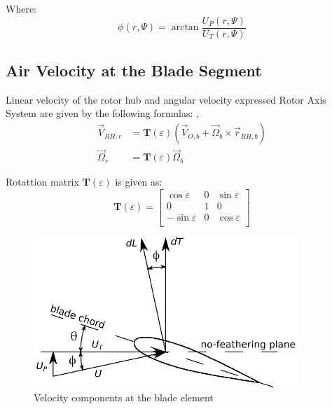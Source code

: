Where:
\begin{equation}
  \phi \left( r , \Psi \right)
  =
  \arctan \frac{ U_P \left( r, \Psi \right) }{ U_T \left( r, \Psi \right) }
\end{equation}

\subsection{Air Velocity at the Blade Segment}

Linear velocity of the rotor hub and angular velocity expressed Rotor Axis System are given by the following formulas: \cite{Stepniewski1984}, \cite{Bramwell2001}
\begin{align}
  {\vec V}_{RH,r}
  &=
  {\boldsymbol T} \left( \varepsilon \right)
  \left(
    {\vec V}_{O,b} + {\vec \Omega}_b \times {\vec r}_{RH,b}
  \right) \\
  {\vec \Omega}_r
  &=
  {\boldsymbol T} \left( \varepsilon \right)
  {\vec \Omega}_b
\end{align}

Rotattion matrix ${\boldsymbol T} \left( \varepsilon \right)$ is given as:
\begin{equation}
  {\boldsymbol T} \left( \varepsilon \right)
  =
  \left[
    \begin{matrix}
       \cos \varepsilon & 0 & \sin \varepsilon \\
                        0 & 1 &              0 \\
      -\sin \varepsilon & 0 & \cos \varepsilon \\
    \end{matrix}
  \right]
\end{equation}

\begin{figure}
  \centering
  \includegraphics[width=100mm]{images/blade_element_theory_02.eps}
  \caption{Velocity components at the blade element}
\end{figure}

